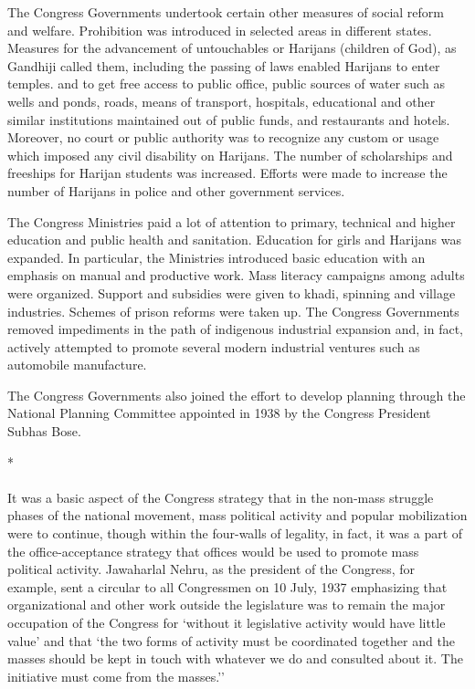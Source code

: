 The Congress Governments undertook certain other measures of social reform and welfare. Prohibition was introduced in selected areas in different states. Measures for the advancement of untouchables or Harijans (children of God), as Gandhiji called them, including the passing of laws enabled Harijans to enter temples. and to get free access to public office, public sources of water such as wells and ponds, roads, means of transport, hospitals, educational and other similar institutions maintained out of public funds, and restaurants and hotels. Moreover, no court or public authority was to recognize any custom or usage which imposed any civil disability on Harijans. The number of scholarships and freeships for Harijan students was increased. Efforts were made to increase the number of Harijans in police and other government services. 

The Congress Ministries paid a lot of attention to primary, technical and higher education and public health and sanitation. Education for girls and Harijans was expanded. In particular, the Ministries introduced basic education with an emphasis on manual and productive work. Mass literacy campaigns among adults were organized. Support and subsidies were given to khadi, spinning and village industries. Schemes of prison reforms were taken up. The Congress Governments removed impediments in the path of indigenous industrial expansion and, in fact, actively attempted to promote several modern industrial ventures such as automobile manufacture. 

The Congress Governments also joined the effort to develop planning through the National Planning Committee appointed in 1938 by the Congress President Subhas Bose.

\begin{center}*\end{center}

\paragraph*{}

It was a basic aspect of the Congress strategy that in the non-mass struggle phases of the national movement, mass political activity and popular mobilization were to continue, though within the four-walls of legality, in fact, it was a part of the office-acceptance strategy that offices would be used to promote mass political activity. Jawaharlal Nehru, as the president of the Congress, for example, sent a circular to all Congressmen on 10 July, 1937 emphasizing that organizational and other work outside the legislature was to remain the major occupation of the Congress for `without it legislative activity would have little value' and that `the two forms of activity must be coordinated together and the masses should be kept in touch with whatever we do and consulted about it. The initiative must come from the masses.'' 

